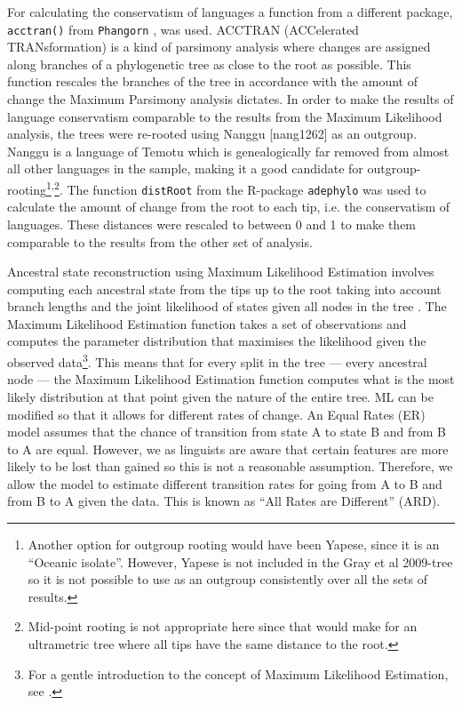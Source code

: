 \documentclass[draft,10pt]{article} %
\begin{document}
For calculating the conservatism of languages a function from a different package, \texttt{acctran()} from \texttt{Phangorn} \citep{phangorn}, was used. ACCTRAN (ACCelerated TRANsformation) is a kind of parsimony analysis where changes are assigned along branches of a phylogenetic tree as close to the root as possible. This function rescales the branches of the tree in accordance with the amount of change the Maximum Parsimony analysis dictates. In order to make the results of language conservatism comparable to the results from the Maximum Likelihood analysis, the trees were re-rooted using Nanggu [nang1262] as an outgroup. Nanggu is a language of Temotu which is genealogically far removed from almost all other languages in the sample, making it a good candidate for outgroup-rooting\footnote{Another option for outgroup rooting would have been Yapese, since it is an ``Oceanic isolate''. However, Yapese is not included in the Gray et al 2009-tree so it is not possible to use as an outgroup consistently over all the sets of results.}\textsuperscript{,}\footnote{Mid-point rooting is not appropriate here since that would make for an ultrametric tree where all tips have the same distance to the root.}. The function \texttt{distRoot} from the R-package \texttt{adephylo} \citep{jombart2017package} was used to calculate the amount of change from the root to each tip, i.e. the conservatism of languages. These distances were rescaled to between 0 and 1 to make them comparable to the results from the other set of analysis.

Ancestral state reconstruction using Maximum Likelihood Estimation involves computing each ancestral state from the tips up to the root taking into account branch lengths and the joint likelihood of states given all nodes in the tree \citep{wilks1938large, fisher1912absolute, pagel1994detecting, cunningham1998reconstructing}. The Maximum Likelihood Estimation function takes a set of observations and computes the parameter distribution that maximises the likelihood given the observed data\footnote{For a gentle introduction to the concept of Maximum Likelihood Estimation, see \citet{jonny_ML}.}. This means that for every split in the tree --- every ancestral node --- the Maximum Likelihood Estimation function computes what is the most likely distribution at that point given the nature of the entire tree. ML can be modified so that it allows for different rates of change. An Equal Rates (ER) model assumes that the chance of transition from state A to state B and from B to A are equal. However, we as linguists are aware that certain features are more likely to be lost than gained so this is not a reasonable assumption. Therefore, we allow the model to estimate different transition rates for going from A to B and from B to A given the data. This is known as ``All Rates are Different'' (ARD).
\end{document}
